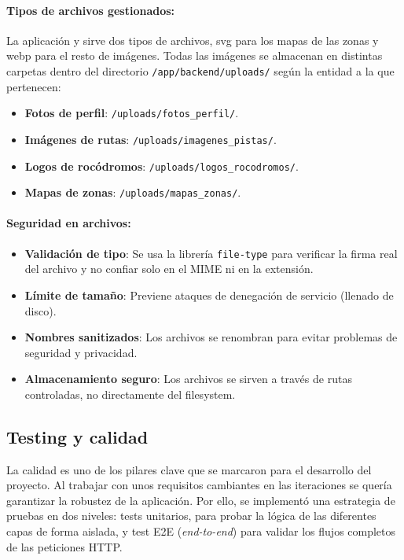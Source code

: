 \paragraph{Tipos de archivos gestionados:}

La aplicación  y sirve dos tipos de archivos, svg para los mapas de las zonas y webp para el resto de imágenes. Todas
las imágenes se almacenan en distintas carpetas dentro del directorio \texttt{/app/backend/uploads/} según la entidad a la que
pertenecen:

\begin{itemize}
  \item \textbf{Fotos de perfil}: \texttt{/uploads/fotos\_perfil/}.
  \item \textbf{Imágenes de rutas}: \texttt{/uploads/imagenes\_pistas/}.
  \item \textbf{Logos de rocódromos}: \texttt{/uploads/logos\_rocodromos/}.
  \item \textbf{Mapas de zonas}: \texttt{/uploads/mapas\_zonas/}.
\end{itemize}

\paragraph{Seguridad en archivos:}

\begin{itemize}
  \item \textbf{Validación de tipo}: Se usa la librería \texttt{file-type} para verificar la firma real del archivo y no confiar solo en el MIME ni en la extensión.
  \item \textbf{Límite de tamaño}: Previene ataques de denegación de servicio (llenado de disco).
  \item \textbf{Nombres sanitizados}: Los archivos se renombran para evitar problemas de seguridad y privacidad.
  \item \textbf{Almacenamiento seguro}: Los archivos se sirven a través de rutas controladas, no directamente del filesystem.
\end{itemize}

\subsection{Testing y calidad}

La calidad es uno de los pilares clave que se marcaron para el desarrollo del proyecto. Al trabajar con unos 
requisitos cambiantes en las iteraciones se quería garantizar la robustez de la aplicación. Por ello, se implementó 
una estrategia de pruebas en dos niveles: tests unitarios, para probar la lógica de las diferentes capas de forma aislada,
y test E2E (\textit{end-to-end}) para validar los flujos completos de las peticiones HTTP.

